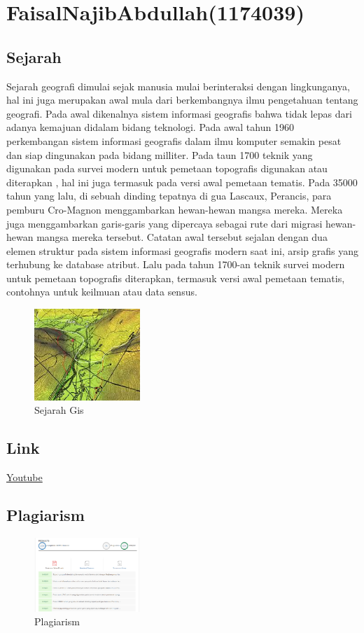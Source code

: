\section{FaisalNajibAbdullah(1174039)}

\subsection{Sejarah}
Sejarah geografi dimulai sejak manusia mulai berinteraksi dengan lingkunganya, hal ini juga merupakan awal mula dari berkembangnya ilmu pengetahuan tentang geografi.
Pada awal dikenalnya sistem informasi geografis bahwa tidak lepas dari adanya kemajuan didalam bidang teknologi. Pada awal tahun 1960 perkembangan sistem informasi geografis dalam ilmu komputer semakin pesat dan siap dingunakan pada bidang milliter. Pada taun 1700 teknik yang digunakan pada survei modern untuk pemetaan topografis digunakan atau diterapkan , hal ini juga termasuk pada versi awal pemetaan tematis.
Pada 35000 tahun yang lalu, di sebuah dinding tepatnya di gua Lascaux, Perancis, para pemburu Cro-Magnon menggambarkan hewan-hewan mangsa mereka. Mereka juga menggambarkan garis-garis yang dipercaya sebagai rute dari migrasi hewan-hewan mangsa mereka tersebut. Catatan awal tersebut sejalan dengan dua elemen struktur pada sistem informasi geografis modern saat ini, arsip grafis yang terhubung ke database atribut. 
Lalu pada tahun 1700-an teknik survei modern untuk pemetaan topografis diterapkan, termasuk versi awal pemetaan tematis, contohnya untuk keilmuan atau data sensus. 
\begin{figure}[H]
	\includegraphics[width=4cm]{figures/1174042/gis.jpg}
	\centering
	\caption{Sejarah Gis}
\end{figure}

\subsection{Link}
\href{https://www.youtube.com/watch?v=8gTLBneTUAo&t=15s}{Youtube}
\subsection{Plagiarism}
\begin{figure}[H]
	\includegraphics[width=4cm]{figures/1174042/plagiat.png}
	\centering
	\caption{Plagiarism}
\end{figure}